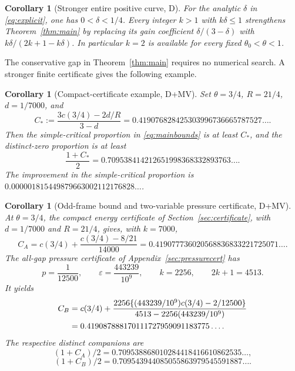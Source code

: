 \documentclass[11pt]{article}
\newtheorem{corollary}[theorem]{Corollary}
\theoremstyle{remark}
\begin{document}
\begin{corollary}[Stronger entire positive curve, D]\label{cor:wholecurve}
For the analytic $\delta$ in \eqref{eq:explicit}, one has $0<\delta<1/4$.
Every integer $k>1$ with $k\delta\le1$ strengthens
Theorem~\ref{thm:main} by replacing its gain coefficient
$\delta/(3-\delta)$ with $k\delta/(2k+1-k\delta)$. In particular $k=2$
is available for every fixed $\theta_0<\theta<1$.
\end{corollary}

The conservative gap in Theorem~\ref{thm:main} requires no numerical
search. A stronger finite certificate gives the following example.

\begin{corollary}[Compact-certificate example, D+MV]\label{cor:example}
Set $\theta=3/4$, $R=21/4$, $d=1/7000$, and
\[
 C_*:=\frac{3c(3/4)-2d/R}{3-d}
 =0.419076828425303996736665787527\ldots.
\]
Then the simple-critical proportion in \eqref{eq:mainbounds} is at least
$C_*$, and the distinct-zero proportion is at least
\[
 \frac{1+C_*}2=0.709538414212651998368332893763\ldots.
\]
The improvement in the simple-critical proportion is
$0.000001815449879663002112176828\ldots$.
\end{corollary}

\begin{corollary}[Odd-frame bound and two-variable pressure certificate, D+MV]\label{cor:pressureexample}
At $\theta=3/4$, the compact energy certificate of
Section~\ref{sec:certificate}, with $d=1/7000$ and $R=21/4$, gives, with
$k=7000$,
\begin{equation}\label{eq:reuseexample}
 C_A=c(3/4)+\frac{c(3/4)-8/21}{14000}
 =0.419077736020568836833221725071\ldots.
\end{equation}
The all-gap pressure certificate of Appendix~\ref{sec:pressurecert} has
\begin{equation}\label{eq:newparams}
 p=\frac1{12500},\qquad\varepsilon=\frac{443239}{10^9},
 \qquad k=2256,\qquad 2k+1=4513.
\end{equation}
It yields
\begin{align}\label{eq:newexample}
 C_B&=c(3/4)+\frac{2256\{(443239/10^9)c(3/4)-2/12500\}}
                         {4513-2256(443239/10^9)}\notag\\
 &=0.419087888170111727959091183775\ldots.
\end{align}
The respective distinct companions are
\[
 (1+C_A)/2=0.709538868010284418416610862535\ldots,
\]
\[
 (1+C_B)/2=0.709543944085055863979545591887\ldots.
\]
\end{corollary}
\end{document}
